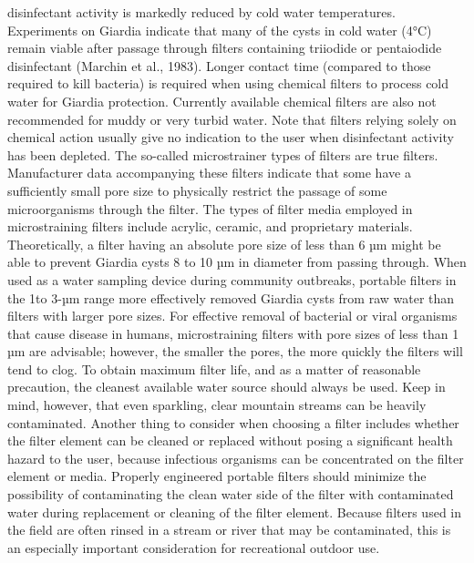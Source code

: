 \documentclass{article}
\begin{document}
disinfectant activity is markedly reduced by cold water temperatures.
Experiments on Giardia indicate that many of the cysts in cold water
(4°C) remain viable after passage through filters containing triiodide
or pentaiodide disinfectant (Marchin et al., 1983). Longer contact time
(compared to those required to kill bacteria) is required when using
chemical filters to process cold water for Giardia protection. Currently
available chemical filters are also not recommended for muddy or very
turbid water. Note that filters relying solely on chemical action
usually give no indication to the user when disinfectant activity has
been depleted. The so-called microstrainer types of filters are true
filters. Manufacturer data accompanying these filters indicate that some
have a sufficiently small pore size to physically restrict the passage
of some microorganisms through the filter. The types of filter media
employed in microstraining filters include acrylic, ceramic, and
proprietary materials. Theoretically, a filter having an absolute pore
size of less than 6 µm might be able to prevent Giardia cysts 8 to 10 µm
in diameter from passing through. When used as a water sampling device
during community outbreaks, portable filters in the 1to 3-µm range more
effectively removed Giardia cysts from raw water than filters with
larger pore sizes. For effective removal of bacterial or viral organisms
that cause disease in humans, microstraining filters with pore sizes of
less than 1 µm are advisable; however, the smaller the pores, the more
quickly the filters will tend to clog. To obtain maximum filter life,
and as a matter of reasonable precaution, the cleanest available water
source should always be used. Keep in mind, however, that even
sparkling, clear mountain streams can be heavily contaminated. Another
thing to consider when choosing a filter includes whether the filter
element can be cleaned or replaced without posing a significant health
hazard to the user, because infectious organisms can be concentrated on
the filter element or media. Properly engineered portable filters should
minimize the possibility of contaminating the clean water side of the
filter with contaminated water during replacement or cleaning of the
filter element. Because filters used in the field are often rinsed in a
stream or river that may be contaminated, this is an especially
important consideration for recreational outdoor use.
\end{document}
